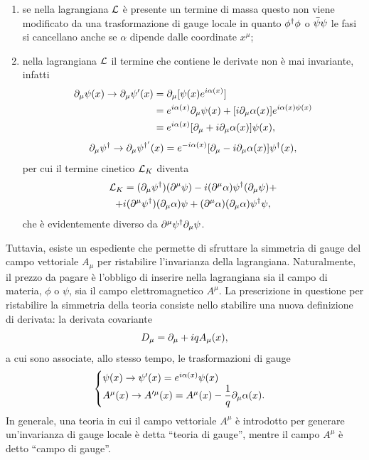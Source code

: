 \begin{enumerate}
    \item se nella lagrangiana $\mathcal{L}$ è presente un termine di massa questo non viene modificato da una trasformazione di gauge locale in quanto $\phi^\dagger\phi$ o $\bar{\psi}\psi$ le fasi si cancellano anche se $\alpha$ dipende dalle coordinate $x^\mu$;
    \item nella lagrangiana $\mathcal{L}$ il termine che contiene le derivate non è mai invariante, infatti
    \begin{equation}
        \begin{split}
            \partial_\mu\psi(x) \to \partial_\mu\psi'(x) &= \partial_\mu[\psi(x)e^{i\alpha(x)}] \\
            &= e^{i\alpha(x)}\partial_\mu\psi(x) + [i\partial_\mu\alpha(x)]e^{i\alpha(x)\psi(x)} \\
            &= e^{i\alpha(x)}[\partial_\mu + i\partial_\mu\alpha(x)]\psi(x),
        \end{split}
    \end{equation}
    \begin{equation}
        \partial_\mu\psi^\dagger \to \partial_\mu\psi^{\dagger'}(x) = e^{-i\alpha(x)}[\partial_\mu - i\partial_\mu\alpha(x)]\psi^\dagger(x),
    \end{equation}
    per cui il termine cinetico $\mathcal{L}_K$ diventa
    \begin{multline}
        \mathcal{L}_K = (\partial_\mu\psi^\dagger)(\partial^\mu\psi) - i(\partial^\mu\alpha)\psi^\dagger(\partial_\mu\psi) + \\ +i(\partial^\mu\psi^\dagger)(\partial_\mu\alpha)\psi + (\partial^\mu\alpha)(\partial_\mu\alpha)\psi^\dagger\psi,
    \end{multline}
    che è evidentemente diverso da $\partial^\mu\psi^\dagger\partial_\mu\psi$.
\end{enumerate}
Tuttavia, esiste un espediente che permette di sfruttare la simmetria di gauge del campo vettoriale $A_\mu$ per ristabilire l'invarianza della lagrangiana. Naturalmente, il prezzo da pagare è l'obbligo di inserire nella lagrangiana sia il campo di materia, $\phi$ o $\psi$, sia il campo elettromagnetico $A^\mu$. La prescrizione in questione per ristabilire la simmetria della teoria consiste nello stabilire una nuova definizione di derivata: la derivata covariante
\begin{equation}
\label{eq: definizione derivata covariante}
    D_\mu = \partial_\mu + iqA_\mu(x),
\end{equation}
a cui sono associate, allo stesso tempo, le trasformazioni di gauge 
\begin{equation}
\label{eq: trasformazioni di gauge}
    \begin{cases}
        \psi(x) \to \psi'(x) = e^{i\alpha(x)}\psi(x) \\
        A^\mu(x) \to A'^\mu(x) = A^\mu(x) - \dfrac{1}{q}\partial_\mu\alpha(x).
    \end{cases}
\end{equation}
In generale, una teoria in cui il campo vettoriale $A^\mu$ è introdotto per generare un'invarianza di gauge locale è detta ``teoria di gauge'', mentre il campo $A^\mu$ è detto ``campo di gauge''. 

